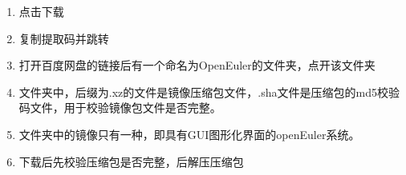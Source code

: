 \begin{enumerate}
\def\labelenumi{\arabic{enumi}.}
\tightlist
\item
  点击下载
\item
  复制提取码并跳转
\item
  打开百度网盘的链接后有一个命名为OpenEuler的文件夹，点开该文件夹
\item
  文件夹中，后缀为.xz的文件是镜像压缩包文件，.sha文件是压缩包的md5校验码文件，用于校验镜像包文件是否完整。
\item
  文件夹中的镜像只有一种，即具有GUI图形化界面的openEuler系统。
\item
  下载后先校验压缩包是否完整，后解压压缩包
\end{enumerate}

